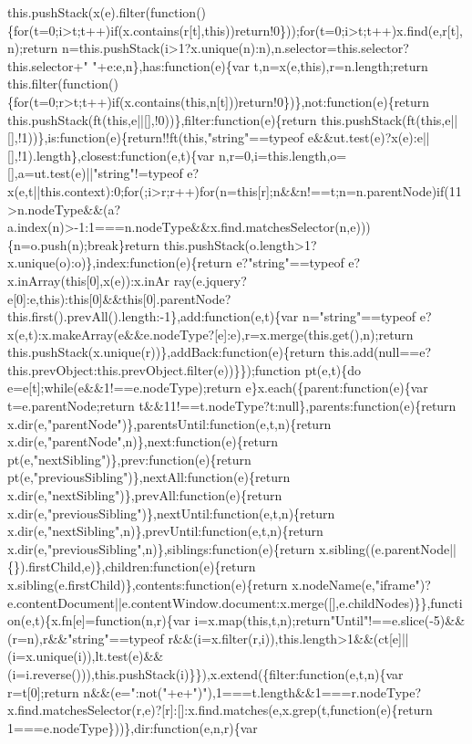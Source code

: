 \begin{DoxyCode}
{       this.pushStack(x(e).filter(function()\{for(t=0;i>t;t++)if(x.contains(r[t],this))return!0\}));for(t=0;i>t;t++)x.find(e,r[t],n);return
       n=this.pushStack(i>1?x.unique(n):n),n.selector=this.selector?this.selector+" "+e:e,n\},has:function(e)\{var t,n=x(e,this),r=n.length;return
       this.filter(function()\{for(t=0;r>t;t++)if(x.contains(this,n[t]))return!0\})\},not:function(e)\{return
       this.pushStack(ft(this,e||[],!0))\},filter:function(e)\{return
       this.pushStack(ft(this,e||[],!1))\},is:function(e)\{return!!ft(this,"string"==typeof e&&ut.test(e)?x(e):e||[],!1).length\},closest:function(e,t)\{var
       n,r=0,i=this.length,o=[],a=ut.test(e)||"string"!=typeof
       e?x(e,t||this.context):0;for(;i>r;r++)for(n=this[r];n&&n!==t;n=n.parentNode)if(11>n.nodeType&&(a?a.index(n)>-1:1===n.nodeType&&x.find.matchesSelector(n,e)))\{n=o.push(n);break\}return
       this.pushStack(o.length>1?x.unique(o):o)\},index:function(e)\{return e?"string"==typeof
       e?x.inArray(this[0],x(e)):x.inAr
      ray(e.jquery?e[0]:e,this):this[0]&&this[0].parentNode?this.first().prevAll().length:-1\},add:function(e,t)\{var n="string"==typeof e?x(e,t):x.makeArray(e&&e.nodeType?[e]:e),r=x.merge(this.get(),n);return
       this.pushStack(x.unique(r))\},addBack:function(e)\{return
       this.add(null==e?this.prevObject:this.prevObject.filter(e))\}\});function pt(e,t)\{do e=e[t];while(e&&1!==e.nodeType);return e\}x.each(\{parent:function(e)\{var
       t=e.parentNode;return t&&11!==t.nodeType?t:null\},parents:function(e)\{return
       x.dir(e,"parentNode")\},parentsUntil:function(e,t,n)\{return x.dir(e,"parentNode",n)\},next:function(e)\{return pt(e,"nextSibling")\},prev:function(e)\{return
       pt(e,"previousSibling")\},nextAll:function(e)\{return x.dir(e,"nextSibling")\},prevAll:function(e)\{return
       x.dir(e,"previousSibling")\},nextUntil:function(e,t,n)\{return
       x.dir(e,"nextSibling",n)\},prevUntil:function(e,t,n)\{return x.dir(e,"previousSibling",n)\},siblings:function(e)\{return
       x.sibling((e.parentNode||\{\}).firstChild,e)\},children:function(e)\{return x.sibling(e.firstChild)\},contents:function(e)\{return
       x.nodeName(e,"iframe")?e.contentDocument||e.contentWindow.document:x.merge([],e.childNodes)\}\},function(e,t)\{x.fn[e]=function(n,r)\{var
       i=x.map(this,t,n);return"Until"!==e.slice(-5)&&(r=n),r&&"string"==typeof
       r&&(i=x.filter(r,i)),this.length>1&&(ct[e]||(i=x.unique(i)),lt.test(e)&&(i=i.reverse())),this.pushStack(i)\}\}),x.extend(\{filter:function(e,t,n)\{var
       r=t[0];return
       n&&(e=":not("+e+")"),1===t.length&&1===r.nodeType?x.find.matchesSelector(r,e)?[r]:[]:x.find.matches(e,x.grep(t,function(e)\{return 1===e.nodeType\}))\},dir:function(e,n,r)\{var
}
\end{DoxyCode}
